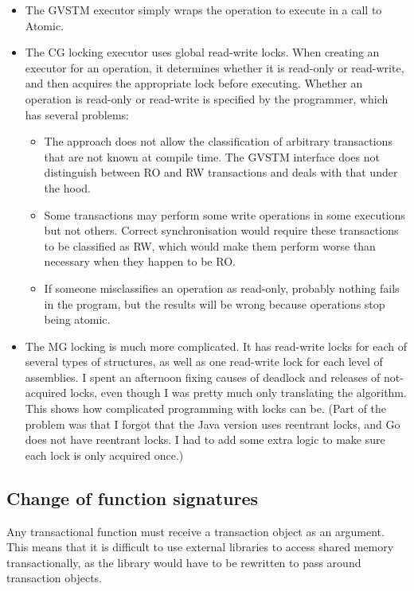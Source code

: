 \documentclass[12pt,a4paper,oneside,openright]{report}
\begin{document}
\begin{itemize}
\item The GVSTM executor simply wraps the operation to execute in a
  call to Atomic.
\item The CG locking executor uses global read-write locks. When
  creating an executor for an operation, it determines whether it is
  read-only or read-write, and then acquires the appropriate lock
  before executing. Whether an operation is read-only or read-write is
  specified by the programmer, which has several problems:
  \begin{itemize}
  \item The approach does not allow the classification of arbitrary
    transactions that are not known at compile time. The GVSTM
    interface does not distinguish between RO and RW transactions and
    deals with that under the hood.
  \item Some transactions may perform some write operations in some
    executions but not others. Correct synchronisation would require
    these transactions to be classified as RW, which would make them
    perform worse than necessary when they happen to be RO.
  \item If someone misclassifies an operation as read-only, probably
    nothing fails in the program, but the results will be wrong
    because operations stop being atomic.
  \end{itemize}

\item The MG locking is much more complicated. It has read-write locks
  for each of several types of structures, as well as one read-write
  lock for each level of assemblies. I spent an afternoon fixing
  causes of deadlock and releases of not-acquired locks, even though I
  was pretty much only translating the algorithm. This shows how
  complicated programming with locks can be. (Part of the problem was
  that I forgot that the Java version uses reentrant locks, and Go
  does not have reentrant locks. I had to add some extra logic to make
  sure each lock is only acquired once.)
\end{itemize}

\subsection{Change of function signatures}
\label{sec:eval:change-funct-sign}

Any transactional function must receive a transaction object as an
argument. This means that it is difficult to use external libraries to
access shared memory transactionally, as the library would have to be
rewritten to pass around transaction objects.
\end{document}
